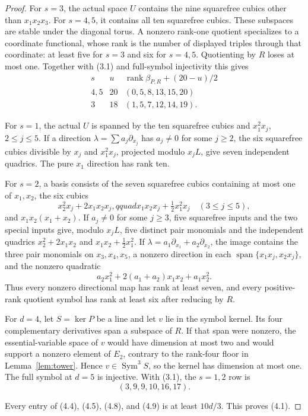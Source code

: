 \documentclass[11pt]{amsart}
\newcommand{\Sym}{\operatorname{Sym}}
\newcommand{\Span}{\operatorname{span}}
\newcommand{\rank}{\operatorname{rank}}
\theoremstyle{definition}
\begin{document}
\begin{proof}
For \(s=3\), the actual space \(U\) contains the nine squarefree cubics
other than \(x_1x_2x_3\). For \(s=4,5\), it contains all ten squarefree
cubics. These subspaces are stable under the diagonal torus. A nonzero
rank-one quotient specializes to a coordinate functional, whose rank is the
number of displayed triples through that coordinate: at least five for
\(s=3\) and six for \(s=4,5\). Quotienting by \(R\) loses at most one.
Together with (3.1) and full-symbol injectivity this gives
\[
\begin{array}{c|c|c}
s&u&\rank\beta_{P,R}+(20-u)/2\\ \hline
4,5&20&(0,5,8,13,15,20)\\
3&18&(1,5,7,12,14,19).
\end{array} \tag{4.8}
\]

For \(s=1\), the actual \(U\) is spanned by the ten squarefree cubics and
\(x_1^2x_j\), \(2\le j\le5\). If a direction
\(\lambda=\sum a_j\partial_{x_j}\) has \(a_j\ne0\) for some \(j\ge2\),
the six squarefree cubics divisible by \(x_j\) and \(x_1^2x_j\), projected
modulo \(x_jL\), give seven independent quadrics. The pure \(x_1\)
direction has rank ten.

For \(s=2\), a basis consists of the seven squarefree cubics containing at
most one of \(x_1,x_2\), the six cubics
\[
 x_2^2x_j+2x_1x_2x_j,qquad
 x_1x_2x_j+\tfrac12x_1^2x_j\quad(3\le j\le5),
\]
and \(x_1x_2(x_1+x_2)\). If \(a_j\ne0\) for some \(j\ge3\), five
squarefree inputs and the two special inputs give, modulo \(x_jL\), five
distinct pair monomials and the independent quadrics
\(x_2^2+2x_1x_2\) and \(x_1x_2+\tfrac12x_1^2\). If
\(\lambda=a_1\partial_{x_1}+a_2\partial_{x_2}\), the image contains the
three pair monomials on \(x_3,x_4,x_5\), a nonzero direction in each
\(\Span\{x_1x_j,x_2x_j\}\), and the nonzero quadratic
\[
 a_2x_1^2+2(a_1+a_2)x_1x_2+a_1x_2^2.
\]
Thus every nonzero directional map has rank at least seven, and every
positive-rank quotient symbol has rank at least six after reducing by \(R\).

For \(d=4\), let \(S=\ker P\) be a line and let \(v\) lie in the symbol
kernel. Its four complementary derivatives span a subspace of \(R\). If
that span were nonzero, the essential-variable space of \(v\) would have
dimension at most two and would support a nonzero element of \(E_2\),
contrary to the rank-four floor in Lemma~\ref{lem:tower}. Hence
\(v\in\Sym^3S\), so the kernel has dimension at most one. The full symbol at
\(d=5\) is injective. With (3.1), the \(s=1,2\) row is
\[
 (3,9,9,10,16,17). \tag{4.9}
\]

Every entry of (4.4), (4.5), (4.8), and (4.9) is at least \(10d/3\).
This proves (4.1).
\end{proof}
\end{document}
